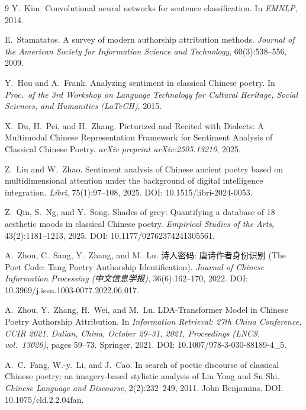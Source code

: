 \documentclass[11pt]{article}
\begin{document}

\begin{thebibliography}{9}
Y.~Kim.
\newblock Convolutional neural networks for sentence classification.
\newblock In \emph{EMNLP}, 2014.

E.~Stamatatos.
\newblock A survey of modern authorship attribution methods.
\newblock \emph{Journal of the American Society for Information Science
and Technology}, 60(3):538--556, 2009.

Y.~Hou and A.~Frank.
\newblock Analyzing sentiment in classical Chinese poetry.
\newblock In \emph{Proc.\ of the 3rd Workshop on Language Technology for
Cultural Heritage, Social Sciences, and Humanities (LaTeCH)}, 2015.

X.~Du, H.~Pei, and H.~Zhang.
\newblock Picturized and Recited with Dialects: A Multimodal Chinese
Representation Framework for Sentiment Analysis of Classical Chinese
Poetry.
\newblock \emph{arXiv preprint arXiv:2505.13210}, 2025.

Z.~Liu and W.~Zhao.
\newblock Sentiment analysis of Chinese ancient poetry based on multidimensional
attention under the background of digital intelligence integration.
\newblock \emph{Libri}, 75(1):97--108, 2025. DOI: 10.1515/libri-2024-0053.

Z.~Qin, S.~Ng, and Y.~Song.
\newblock Shades of grey: Quantifying a database of 18 aesthetic moods in
classical Chinese poetry.
\newblock \emph{Empirical Studies of the Arts}, 43(2):1181--1213, 2025.
DOI: 10.1177/02762374241305561.

A.~Zhou, C.~Sang, Y.~Zhang, and M.~Lu.
\newblock 诗人密码: 唐诗作者身份识别 (The Poet Code: Tang Poetry Authorship
Identification).
\newblock \emph{Journal of Chinese Information Processing
(中文信息学报)}, 36(6):162--170, 2022. DOI: 10.3969/j.issn.1003-0077.2022.06.017.

A.~Zhou, Y.~Zhang, H.~Wei, and M.~Lu.
\newblock LDA-Transformer Model in Chinese Poetry Authorship Attribution.
\newblock In \emph{Information Retrieval: 27th China Conference, CCIR 2021,
Dalian, China, October 29--31, 2021, Proceedings (LNCS, vol.~13026)}, pages
59--73. Springer, 2021. DOI: 10.1007/978-3-030-88189-4\_5.

A.~C.~Fang, W.-y.~Li, and J.~Cao.
\newblock In search of poetic discourse of classical Chinese poetry: an
  imagery-based stylistic analysis of Liu Yong and Su Shi.
\newblock \emph{Chinese Language and Discourse}, 2(2):232--249, 2011.
  John Benjamins. DOI: 10.1075/cld.2.2.04fan.


\end{thebibliography}
\end{document}
